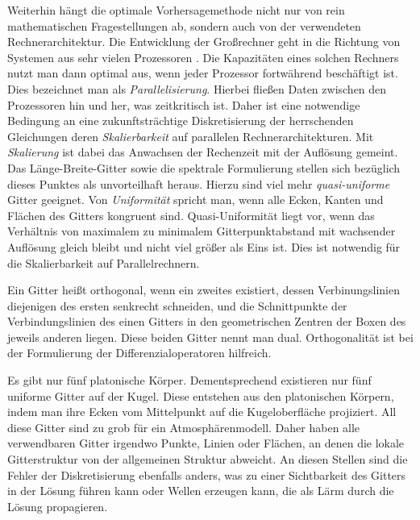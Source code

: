 \documentclass{book}
\begin{document}
Weiterhin hängt die optimale Vorhersagemethode nicht nur von rein mathematischen Fragestellungen ab, sondern auch von der verwendeten Rechnerarchitektur. Die Entwicklung der Großrechner geht in die Richtung von Systemen aus sehr vielen Prozessoren \cite{staniforth_grids}. Die Kapazitäten eines solchen Rechners nutzt man dann optimal aus, wenn jeder Prozessor fortwährend beschäftigt ist. Dies bezeichnet man als \textit{Parallelisierung}. Hierbei fließen Daten zwischen den Prozessoren hin und her, was zeitkritisch ist. Daher ist eine notwendige Bedingung an eine zukunftsträchtige Diskretisierung der herrschenden Gleichungen deren \textit{Skalierbarkeit} auf parallelen Rechnerarchitekturen. Mit \textit{Skalierung} ist dabei das Anwachsen der Rechenzeit mit der Auflösung gemeint. Das Länge-Breite-Gitter sowie die spektrale Formulierung stellen sich bezüglich dieses Punktes als unvorteilhaft heraus. Hierzu sind viel mehr \textit{quasi-uniforme} Gitter geeignet. Von \textit{Uniformität} spricht man, wenn alle Ecken, Kanten und Flächen des Gitters kongruent sind. Quasi-Uniformität liegt vor, wenn das Verhältnis von maximalem zu minimalem Gitterpunktabstand mit wachsender Auflösung gleich bleibt und nicht viel größer als Eins ist. Dies ist notwendig für die Skalierbarkeit auf Parallelrechnern.

Ein Gitter heißt orthogonal, wenn ein zweites existiert, dessen Verbinungslinien diejenigen des ersten senkrecht schneiden, und die Schnittpunkte der Verbindungslinien des einen Gitters in den geometrischen Zentren der Boxen des jeweils anderen liegen. Diese beiden Gitter nennt man dual. Orthogonalität ist bei der Formulierung der Differenzialoperatoren hilfreich.

Es gibt nur fünf platonische Körper. Dementsprechend existieren nur fünf uniforme Gitter auf der Kugel. Diese entstehen aus den platonischen Körpern, indem man ihre Ecken vom Mittelpunkt auf die Kugeloberfläche projiziert. All diese Gitter sind zu grob für ein Atmosphärenmodell. Daher haben alle verwendbaren Gitter irgendwo Punkte, Linien oder Flächen, an denen die lokale Gitterstruktur von der allgemeinen Struktur abweicht. An diesen Stellen sind die Fehler der Diskretisierung ebenfalls anders, was zu einer Sichtbarkeit des Gitters in der Lösung führen kann oder Wellen erzeugen kann, die als Lärm durch die Lösung propagieren. 
\end{document}
